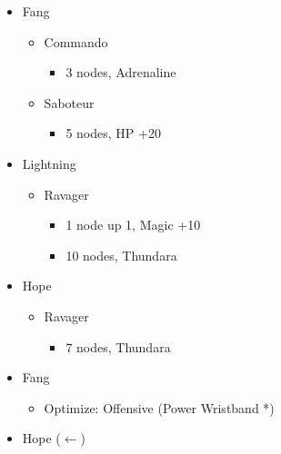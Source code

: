 \begin{paracol}{2}
\begin{menu}
\begin{itemize}
\begin{itemize}
				      {\paradigmline{\sen}{(\rav)}{(\rav)}}%
				      {\paradigmline{\sab}{(\rav)}{\syn}}%
				      {\paradigmline{\com}{\rav}{\rav}}
			\end{itemize}
			\crystarium
			\begin{itemize}
				\item Fang
				      \begin{itemize}
					      \item Commando
					            \begin{itemize}
						            \item 3 nodes, Adrenaline
					            \end{itemize}
					      \item Saboteur
					            \begin{itemize}
						            \item 5 nodes, HP +20
					            \end{itemize}
				      \end{itemize}
				\item Lightning
				      \begin{itemize}
					      \item Ravager
					            \begin{itemize}
						            \item 1 node up 1, Magic +10
						            \item 10 nodes, Thundara
					            \end{itemize}
				      \end{itemize}
				\item Hope
				      \begin{itemize}
					      \item Ravager
					            \begin{itemize}
						            \item 7 nodes, Thundara
					            \end{itemize}
				      \end{itemize}
			\end{itemize}
			\equip
			\begin{itemize}
				\item Fang
				      \begin{itemize}
					      \item Optimize: Offensive (Power Wristband *)
				      \end{itemize}
				\item Hope ($\leftarrow$)
				      \begin{itemize}

\end{itemize}
\end{itemize}
\end{itemize}
\end{menu}
\end{paracol}

